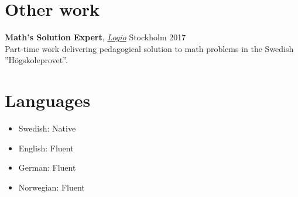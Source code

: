 \documentclass[11pt, a4paper]{article}
\begin{document}
\section*{Other work}
\textbf{Math's Solution Expert}, \textit{\href{https://logio.se}{Logio}} Stockholm \hfill 2017 \\
    Part-time work delivering pedagogical solution to math problems in the Swedish
    ”Högskoleprovet”.

\section*{Languages}
\begin{itemize}[noitemsep]
    \item Swedish: Native
    \item English: Fluent
    \item German: Fluent
    \item Norwegian: Fluent
\end{itemize}
\end{document}
